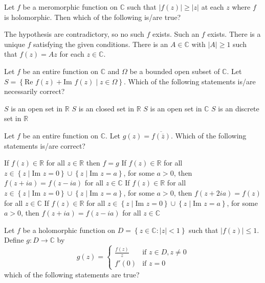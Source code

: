 \documentclass[10pt]{exam}
\newcommand{\R}{\ensuremath{\mathbb{R}}}
\newcommand{\C}{\ensuremath{\mathbb{C}}}
\newcommand{\set}[1]{\ensuremath{\left \{ {#1} \right \}}}
\begin{document}
\begin{questions}
\question 
Let $f$ be a meromorphic function on $\C$ such that $|f(z)| \geq |z|$ at each $z$ where $f$ is holomorphic. Then which of the following is/are true?

\begin{checkboxes}
\choice The hypothesis are contradictory, so no such $f$ exists.
\choice Such an $f$ exists. 
\choice There is a unique $f$ satisfying the given conditions. 
\choice There is an $A \in \C $ with $|A| \geq 1$ such that $f(z) = Az$ for each $z \in \C$.
\end{checkboxes}


\question 
Let $f$ be an entire function on $\C$ and $\Omega $ be a bounded open subset of $\C$. Let $S = \set{\text{Re }f(z) + \text{Im }f(z) \mid z \in \Omega}$. Which of the following statements is/are necessarily correct?

\begin{checkboxes}
\choice $S$ is an open set in $\R$ 
\choice $S$ is an closed set in $\R$ 
\choice $S$ is an open set in $\C$ 
\choice $S$ is an discrete set in $\R$ 
\end{checkboxes}

\question 
Let $f$ be an entire function on $\C$. Let $g(z) = \overline{f(\overline{z})}$. Which of the following statements is/are correct?

\begin{checkboxes}
\choice If $f(z) \in \R$ for all $z \in \R$ then $f = g$ 
\choice If $f(z) \in \R$ for all $z \in \set{z \mid \text{Im }z = 0} \cup \set{z \mid \text{Im }z = a}$, for some $a > 0$, then $f(z + ia) = f(z - ia)$ for all $z \in \C$ 
\choice If $f(z) \in \R$ for all $z \in \set{z \mid \text{Im }z = 0} \cup \set{z \mid \text{Im }z = a}$, for some $a > 0$, then $f(z + 2ia) = f(z)$ for all $z \in \C$ 
\choice If $f(z) \in \R$ for all $z \in \set{z \mid \text{Im }z = 0} \cup \set{z \mid \text{Im }z = a}$, for some $a > 0$, then $f(z + ia) = f(z - ia)$ for all $z \in \C$ 
\end{checkboxes}

\question 
Let $f$ be a holomorphic function on $D=\set{z \in \C: |z| < 1}$ such that $|f(z)| \leq 1$. Define $g:D \rightarrow \C$ by 
$$g(z) = \begin{cases} \frac{f(z)}{z} & \mbox{if } z \in D, z \neq 0 \\ 
f'(0) & \mbox{if } z =0  \end{cases}$$
which of the following statements are true?


\end{questions}
\end{document}
